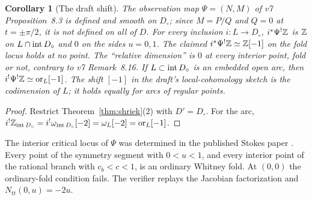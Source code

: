 \documentclass[11pt]{article}
\newtheorem{corollary}[theorem]{Corollary}
\theoremstyle{definition}\newtheorem{definition}[theorem]{Definition}
\theoremstyle{remark}\newtheorem{remark}[theorem]{Remark}
\newcommand{\orr}{\mathrm{or}}
\begin{document}
\begin{corollary}[The draft shift]\label{cor:shift}
The observation map $\Psi=(N,M)$ of v7 Proposition~8.3 is defined and smooth on
$D_\circ$; since $M=P/Q$ and $Q=0$ at $t=\pm\pi/2$, it is not defined on all of $D$.
For every inclusion $i:L\to D_\circ$, $i^*\Psi^!\mathbb Z$ is $\mathbb Z$ on $L\cap\operatorname{int} D_\circ$
and $0$ on the sides $u=0,1$.
The claimed $i^*\Psi^!\mathbb Z\simeq\mathbb Z[-1]$ on the fold locus holds at no point. The
``relative dimension'' is $0$ at every interior point, fold or not, contrary to
v7 Remark~8.16. If $L\subset\operatorname{int} D_\circ$ is an embedded open arc, then
$i^!\Psi^!\Z\simeq\orr_L[-1]$. The shift $[-1]$ in the draft's local-cohomology sketch is the
codimension of $L$; it holds equally for arcs of regular points.
\end{corollary}
\begin{proof}
Restrict Theorem~\ref{thm:shriek}(2) with $D'=D_\circ$. For the arc,
$i^!\Z_{\inte D_\circ}=i^!\omega_{\inte D_\circ}[-2]=\omega_L[-2]=\orr_L[-1]$.
\end{proof}

The interior critical locus of $\Psi$ was determined in the published Stokes
paper \cite[Theorem~2.4]{stokes}. Every point of the symmetry segment with
$0<u<1$, and every interior point of the rational branch with $c_b<c<1$, is an
ordinary Whitney fold. At $(0,0)$ the ordinary-fold condition fails. The verifier
replays the Jacobian factorization and $N_{tt}(0,u)=-2u$.
\end{document}
